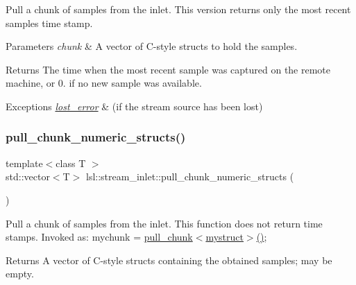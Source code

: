 Pull a chunk of samples from the inlet. This version returns only the most recent sample\textquotesingle{}s time stamp. 
\begin{DoxyParams}{Parameters}
{\em chunk} & A vector of C-\/style structs to hold the samples. \\
\hline
\end{DoxyParams}
\begin{DoxyReturn}{Returns}
The time when the most recent sample was captured on the remote machine, or 0. if no new sample was available. 
\end{DoxyReturn}

\begin{DoxyExceptions}{Exceptions}
{\em \hyperlink{classlsl_1_1lost__error}{lost\+\_\+error}} & (if the stream source has been lost) \\
\hline
\end{DoxyExceptions}
\mbox{\label{classlsl_1_1stream__inlet_a4a743ed5df78b05dcc038e73a1d4fb9b}} 
\subsubsection{\texorpdfstring{pull\+\_\+chunk\+\_\+numeric\+\_\+structs()}{pull\_chunk\_numeric\_structs()}\hspace{0.1cm}{\footnotesize\ttfamily [3/3]}}
{\footnotesize\ttfamily template$<$class T $>$ \\
std\+::vector$<$T$>$ lsl\+::stream\+\_\+inlet\+::pull\+\_\+chunk\+\_\+numeric\+\_\+structs (\begin{DoxyParamCaption}{ }\end{DoxyParamCaption})\hspace{0.3cm}{\ttfamily [inline]}}

Pull a chunk of samples from the inlet. This function does not return time stamps. Invoked as\+: mychunk = \hyperlink{classlsl_1_1stream__inlet_a558f53812f5dc3c19b2cbe0026a61f6a}{pull\+\_\+chunk$<$mystruct$>$()}; \begin{DoxyReturn}{Returns}
A vector of C-\/style structs containing the obtained samples; may be empty. 
\end{DoxyReturn}

